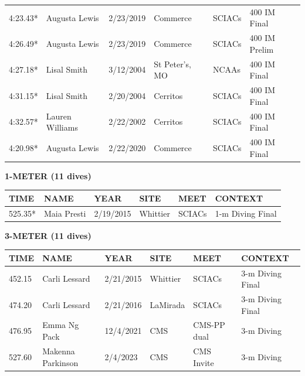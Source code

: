 \begin{table}[H]
\begin{minipage}[t]{0.48\textwidth}
\begin{tabular}{@{}p{1.8cm}p{2.8cm}p{1.2cm}p{1.4cm}p{1.4cm}p{2.0cm}@{}}
    4:23.43* & Augusta Lewis & 2/23/2019 & Commerce & SCIACs & 400 IM Final \\
    4:26.49* & Augusta Lewis & 2/23/2019 & Commerce & SCIACs & 400 IM Prelim \\
    4:27.18* & Lisal Smith & 3/12/2004 & St Peter's, MO & NCAAs & 400 IM Final \\
    4:31.15* & Lisal Smith & 2/20/2004 & Cerritos & SCIACs & 400 IM Final \\
    4:32.57* & Lauren Williams & 2/22/2002 & Cerritos & SCIACs & 400 IM Final \\
    4:20.98* & Augusta Lewis & 2/22/2020 & Commerce & SCIACs & 400 IM Final \\
\hline
\end{tabular}
\end{minipage}
\end{table}

\begin{table}[H]
\centering
\begin{minipage}[t]{0.6\textwidth}
\centering
\textbf{1-METER (11 dives)}\\[0.1cm]
\begin{tabular}{@{}p{1.8cm}p{2.8cm}p{1.2cm}p{1.4cm}p{1.4cm}p{2.0cm}@{}}
\hline
    \textbf{TIME} & \textbf{NAME} & \textbf{YEAR} & \textbf{SITE} & \textbf{MEET} & \textbf{CONTEXT} \\
\hline
    525.35* & Maia Presti & 2/19/2015 & Whittier & SCIACs & 1-m Diving Final \\
\hline
\end{tabular}
\end{minipage}
\end{table}

\begin{table}[H]
\centering
\begin{minipage}[t]{0.6\textwidth}
\centering
\textbf{3-METER (11 dives)}\\[0.1cm]
\begin{tabular}{@{}p{1.8cm}p{2.8cm}p{1.2cm}p{1.4cm}p{1.4cm}p{2.0cm}@{}}
\hline
    \textbf{TIME} & \textbf{NAME} & \textbf{YEAR} & \textbf{SITE} & \textbf{MEET} & \textbf{CONTEXT} \\
\hline
    452.15 & Carli Lessard & 2/21/2015 & Whittier & SCIACs & 3-m Diving Final \\
    474.20 & Carli Lessard & 2/21/2016 & LaMirada & SCIACs & 3-m Diving Final \\
    476.95 & Emma Ng Pack & 12/4/2021 & CMS & CMS-PP dual & 3-m Diving \\
    527.60 & Makenna Parkinson & 2/4/2023 & CMS & CMS Invite & 3-m Diving \\
\hline
\end{tabular}
\end{minipage}
\end{table}

